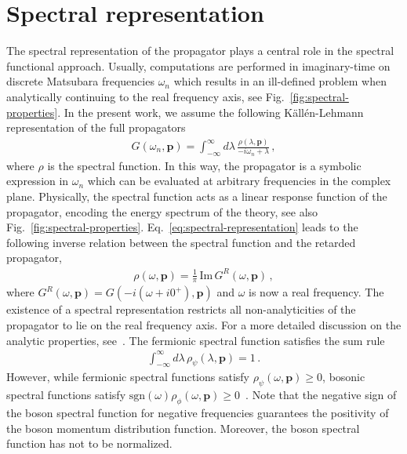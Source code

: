 \section{Spectral representation}
\label{section:spectral-representation}

The spectral representation of the propagator plays a central role in the spectral functional approach. Usually, computations are performed in imaginary-time on discrete Matsubara frequencies $\omega_n$ which results in an ill-defined problem when analytically continuing to the real frequency axis, see Fig.~\ref{fig:spectral-properties}. In the present work, we assume the following Källén-Lehmann representation of the full propagators~\cite{Abrikosov1975,Fetter1971,Haussmann2009}
%
\begin{align}
	\label{eq:spectral-representation}
	G(\omega_n,\bm{p}) = \int_{-\infty}^{\infty} d\lambda \, \frac{\rho(\lambda,\bm{p})}{-i\omega_n+\lambda} \,,
\end{align}
%
where $\rho$ is the spectral function. In this way, the propagator is a symbolic expression in $\omega_n$ which can be evaluated at arbitrary frequencies in the complex plane. Physically, the spectral function acts as a linear response function of the propagator, encoding the energy spectrum of the theory, see also Fig.~\ref{fig:spectral-properties}. Eq.~\eqref{eq:spectral-representation} leads to the following inverse relation between the spectral function and the retarded propagator,
%
\begin{align}
	\label{eq:spectral-relation}
	\rho(\omega,\bm{p}) = \frac{1}{\pi}\, \mathrm{Im}\, G^R(\omega,\bm{p}) \,,
\end{align}
%
where $G^R(\omega,\bm{p})=G(-i(\omega+i0^+),\bm{p})$ and $\omega$ is now a real frequency. The existence of a spectral representation restricts all
non-analyticities of the propagator to lie on the real
frequency axis. For a more detailed discussion on the analytic properties, see~\cite{Perali2002,Rohe2001,Wink2020}. The fermionic spectral function satisfies the sum rule~\cite{Fratini2013}
%
\begin{align}
	\label{eq:spectral-sum-rule}
	\int_{-\infty}^{\infty} d\lambda\,\rho_{\psi}(\lambda,\bm{p}) = 1 \,.
\end{align}
%
However, while fermionic spectral functions satisfy $\rho_{\psi}(\omega,\bm{p}) \geq 0$, bosonic spectral functions satisfy $\mathrm{sgn}(\omega) \rho_{\phi}(\omega,\bm{p}) \geq 0$~\cite{Fetter1971}.
Note that the negative sign of the boson spectral function for negative frequencies guarantees the positivity of the boson momentum distribution function.
Moreover, the boson spectral function has not to be normalized.

